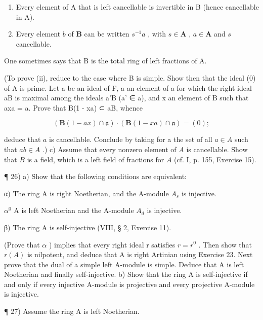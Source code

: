 \begin{enumerate}
\def\labelenumi{(\roman{enumi})}
\item
  Every element of A that is left cancellable is invertible in B (hence cancellable in A).
\item
  Every element \(b\) of \(\mathbf{B}\) can be written \(s^{-1}a\) , with \(s \in \mathbf{A}\) , \(a \in \mathbf{A}\) and \(s\) cancellable.
\end{enumerate}

One sometimes says that B is the total ring of left fractions of A.

(To prove (ii), reduce to the case where B is simple. Show then that the ideal (0) of A is prime. Let a be an ideal of F, a an element of a for which the right ideal aB is maximal among the ideals a'B (a' ∈ a), and x an element of B such that axa = a. Prove that B(1 - xa) ⊂ aB, whence

\[
(\mathbf {B} (1 - a x) \cap \mathfrak {a}) \cdot (\mathbf {B} (1 - x a) \cap \mathfrak {a}) = (0);
\]

deduce that \(a\) is cancellable. Conclude by taking for a the set of all \(a \in A\) such that \(ab \in A\) .) c) Assume that every nonzero element of \(A\) is cancellable. Show that \(B\) is a field, which is a left field of fractions for \(A\) (cf. I, p. 155, Exercise 15).

¶ 26) a) Show that the following conditions are equivalent:

α) The ring A is right Noetherian, and the A-module \(A_{s}\) is injective.

\(\alpha^{0}\) A is left Noetherian and the A-module \(A_{d}\) is injective.

β) The ring A is self-injective (VIII, § 2, Exercise 11).

(Prove that \(\alpha\) ) implies that every right ideal r satisfies \(r = r^0\) . Then show that \(r(A)\) is nilpotent, and deduce that A is right Artinian using Exercise 23. Next prove that the dual of a simple left A-module is simple. Deduce that A is left Noetherian and finally self-injective. b) Show that the ring A is self-injective if and only if every injective A-module is projective and every projective A-module is injective.

¶ 27) Assume the ring A is left Noetherian.

